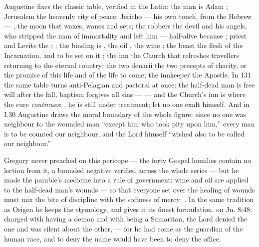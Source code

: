\begin{witnessnote}
Augustine fixes the classic table, verified in the Latin: the man is Adam
; Jerusalem the heavenly city of peace; Jericho ---
his own touch, from the Hebrew --- , the moon that waxes, wanes and sets; the robbers the
devil and his angels, who stripped the man of immortality and left him
 --- half-alive because ; priest and Levite the
; ; the binding is
, the oil , the wine
; the beast the flesh of
the Incarnation, and to be set on it ; the inn the Church that refreshes travellers returning to the
eternal country; the two denarii the two precepts of charity, or the promise
of this life and of the life to come; the innkeeper the Apostle. In
 131 the same table turns anti-Pelagian and pastoral at once: the
half-dead man is free will after the fall, baptism forgives all sins ---
 --- and the
Church's inn is where the cure \textit{continues}: , he
is still under treatment; let no one exalt himself. And in  I.30 Augustine draws the moral boundary of the whole figure:
since no one was neighbour to the wounded man ``except him who took pity upon
him,'' every man is to be counted our neighbour, and the Lord himself
``wished also to be called our neighbour.''
\end{witnessnote}

\begin{witnessnote}
Gregory never preached on this pericope --- the forty Gospel homilies contain
no lection from it, a bounded negative verified across the whole series ---
but he made the parable's medicine into a rule of government: wine and oil are
applied to the half-dead man's wounds  --- so that everyone set over the healing of wounds must
mix the bite of discipline with the softness of mercy: . In the same tradition as Origen he keeps the
etymology, and gives it its finest formulation, on Jn. 8:48: charged with
having a demon and with being a Samaritan, the Lord denied the one and was
silent about the other,  --- for
he had come as the guardian of the human race, and to deny the name would
have been to deny the office.
\end{witnessnote}

